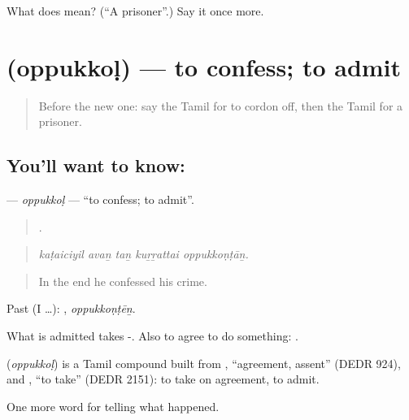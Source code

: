 \begin{tcolorbox}[breakable,colback=teal!4,colframe=teal!35!black,title={Before you move on}]
What does  mean? (\textquotedblleft{}A prisoner\textquotedblright{}.) Say it once more.
\end{tcolorbox}
\section[\texorpdfstring{\ta{ஒப்புக்கொள்} (oppukkoḷ)}{ஒப்புக்கொள் (oppukkoḷ)}]{ (oppukkoḷ) — to confess; to admit}

\label{lesson:TA-C296-oppukkol}



\begin{quote}
Before the new one: say the Tamil for to cordon off, then the Tamil for a prisoner.
\end{quote}

\subsection*{You'll want to know: }
\textbf{} — \emph{oppukkoḷ} — \textquotedblleft{}to confess; to admit\textquotedblright{}.

\begin{quote}
    .
\end{quote}

\begin{quote}
\emph{kaṭaiciyil avaṉ taṉ kuṟṟattai oppukkoṇṭāṉ.}
\end{quote}

\begin{quote}
In the end he confessed his crime.
\end{quote}

Past (I …): , \emph{oppukkoṇṭēṉ}.

What is admitted takes -. Also to agree to do something:  .

\begin{cousinweb}
\textbf{} (\emph{oppukkoḷ}) is a Tamil compound built from , \textquotedblleft{}agreement, assent\textquotedblright{} (DEDR 924), and , \textquotedblleft{}to take\textquotedblright{} (DEDR 2151): to take on agreement, to admit.
\end{cousinweb}

\begin{grammarlens}[title={What you've built}]
One more word for telling what happened.
\end{grammarlens}

